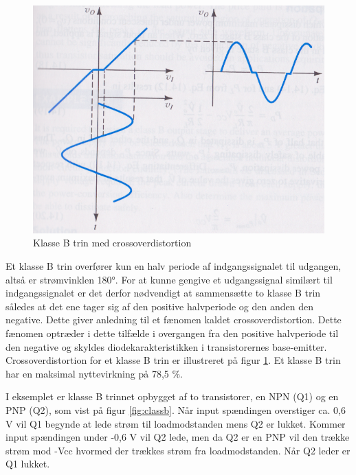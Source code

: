 \begin{figure}[ht]
\begin{minipage}[b]{0.5\linewidth}
\includegraphics[scale=.25]{indledende_analyse/klasser/klassebproblem.png}
\caption{Klasse B trin med crossoverdistortion}
\label{fig:classbproblem}
\end{minipage}
\end{figure}

Et klasse B trin overfører kun en halv periode af indgangssignalet til udgangen, altså er strømvinklen 180°. For at kunne gengive et udgangssignal similært til indgangssignalet er det derfor nødvendigt at sammensætte to klasse B trin således at det ene tager sig af den positive halvperiode og den anden den negative. Dette giver anledning til et fænomen kaldet crossoverdistortion. Dette fænomen optræder i dette tilfælde i overgangen fra den positive halvperiode til den negative og skyldes diodekarakteristikken i transistorernes base-emitter. Crossoverdistortion for et klasse B trin er illustreret på figur \ref{fig:classbproblem}.
Et klasse B trin har en maksimal nyttevirkning på 78,5 \%.

I eksemplet er klasse B trinnet opbygget af to transistorer, en NPN (Q1) og en PNP (Q2), som vist på figur \ref{fig:classb}. Når input spændingen overstiger ca. 0,6 V vil Q1 begynde at lede strøm til loadmodstanden mens Q2 er lukket. Kommer input spændingen under -0,6 V vil Q2 lede, men da Q2 er en PNP vil den trække strøm mod -Vcc hvormed der trækkes strøm fra loadmodstanden. Når Q2 leder er Q1 lukket. 

